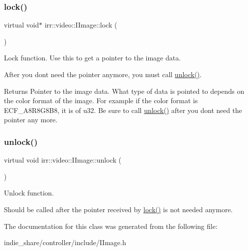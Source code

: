 \subsubsection{\texorpdfstring{lock()}{lock()}}
{\footnotesize\ttfamily virtual void$\ast$ irr\+::video\+::\+I\+Image\+::lock (\begin{DoxyParamCaption}{ }\end{DoxyParamCaption})\hspace{0.3cm}{\ttfamily [pure virtual]}}



Lock function. Use this to get a pointer to the image data. 

After you don\textquotesingle{}t need the pointer anymore, you must call \hyperlink{classirr_1_1video_1_1IImage_ad0f902d74a948ee66be2d70dc90ed38d}{unlock()}. \begin{DoxyReturn}{Returns}
Pointer to the image data. What type of data is pointed to depends on the color format of the image. For example if the color format is E\+C\+F\+\_\+\+A8\+R8\+G8\+B8, it is of u32. Be sure to call \hyperlink{classirr_1_1video_1_1IImage_ad0f902d74a948ee66be2d70dc90ed38d}{unlock()} after you don\textquotesingle{}t need the pointer any more. 
\end{DoxyReturn}
\mbox{\label{classirr_1_1video_1_1IImage_ad0f902d74a948ee66be2d70dc90ed38d}} 
\subsubsection{\texorpdfstring{unlock()}{unlock()}}
{\footnotesize\ttfamily virtual void irr\+::video\+::\+I\+Image\+::unlock (\begin{DoxyParamCaption}{ }\end{DoxyParamCaption})\hspace{0.3cm}{\ttfamily [pure virtual]}}



Unlock function. 

Should be called after the pointer received by \hyperlink{classirr_1_1video_1_1IImage_a5c4b0b5fa2a5f253f93c1b038e20d204}{lock()} is not needed anymore. 

The documentation for this class was generated from the following file\+:\begin{DoxyCompactItemize}
\item 
indie\+\_\+share/controller/include/I\+Image.\+h\end{DoxyCompactItemize}
